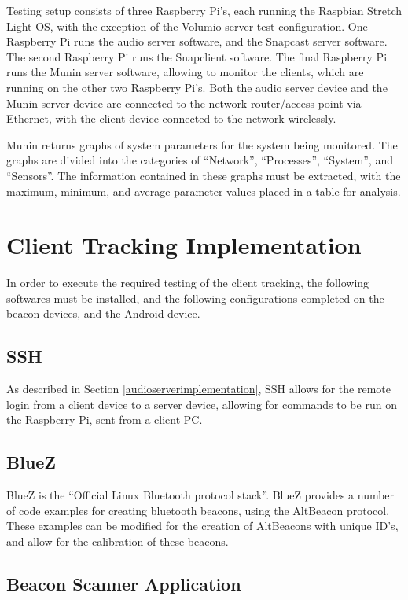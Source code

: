 \documentclass[11pt,a4paper,headinclude=false,footinclude=false]{scrreprt}
\begin{document}
Testing setup consists of three Raspberry Pi's, each running the
Raspbian Stretch Light OS, with the exception of the Volumio server test
configuration. One Raspberry Pi runs the audio server software, and the
Snapcast server software. The second Raspberry Pi runs the Snapclient
software. The final Raspberry Pi runs the Munin server software,
allowing to monitor the clients, which are running on the other two
Raspberry Pi's. Both the audio server device and the Munin server device
are connected to the network router/access point via Ethernet, with the
client device connected to the network wirelessly.

Munin returns graphs of system parameters for the system being
monitored. The graphs are divided into the categories of ``Network'',
``Processes'', ``System'', and ``Sensors''. The information contained in
these graphs must be extracted, with the maximum, minimum, and average
parameter values placed in a table for analysis.

\section{Client Tracking
Implementation}\label{client-tracking-implementation}

In order to execute the required testing of the client tracking, the
following softwares must be installed, and the following configurations
completed on the beacon devices, and the Android device.

\subsection{SSH}\label{ssh-1}

As described in Section \ref{audioserverimplementation}, SSH allows for
the remote login from a client device to a server device, allowing for
commands to be run on the Raspberry Pi, sent from a client PC.

\subsection{BlueZ}\label{bluez}

BlueZ is the ``Official Linux Bluetooth protocol stack''\cite{bluez}.
BlueZ provides a number of code examples for creating bluetooth beacons,
using the AltBeacon protocol. These examples can be modified for the
creation of AltBeacons with unique ID's, and allow for the calibration
of these beacons.

\subsection{Beacon Scanner
Application}\label{beacon-scanner-application}
\end{document}
